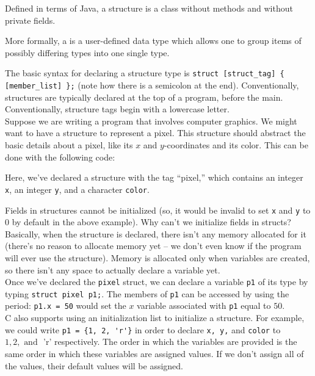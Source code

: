 Defined in terms of Java, a structure is a class without methods and without private fields. 

More formally, a  is a user-defined data type which allows one to group items of possibly differing types into one single type. 

The basic syntax for declaring a structure type is \verb!struct [struct_tag] { [member_list] };! (note how there is a semicolon at the end). Conventionally, structures are typically declared at the top of a program, before the main. Conventionally, structure tags begin with a lowercase letter. \\

Suppose we are writing a program that involves computer graphics. We might want to have a structure to represent a pixel. This structure should abstract the basic details about a pixel, like its $x$ and $y$-coordinates and its color. This can be done with the following code:

\lstset{
caption=Structure Example
}
\begin{center}
\label{Structure Example}
\end{center}


Here, we've declared a structure with the tag ``pixel,'' which contains an integer \verb!x!, an integer \verb!y!, and a character \verb!color!. 


Fields in structures cannot be initialized (so, it would be invalid to set \verb!x! and \verb!y! to $0$ by default in the above example). Why can't we initialize fields in structs? Basically, when the structure is declared, there isn't any memory allocated for it (there's no reason to allocate memory yet -- we don't even know if the program will ever use the structure). Memory is allocated only when variables are created, so there isn't any space to actually declare a variable yet. \\


Once we've declared the \verb!pixel! struct, we can declare a variable \verb!p1! of its type by typing \verb!struct pixel p1;!. The members of \verb!p1! can be accessed by using the period: \verb!p1.x = 50! would set the $x$ variable associated with \verb!p1! equal to $50$. \\

C also supports using an initialization list to initialize a structure. For example, we could write \verb!p1 = {1, 2, 'r'}! in order to declare \verb!x, y,! and \verb!color! to $1, 2, \text{ and }$ 'r' respectively. The order in which the variables are provided is the same order in which these variables are assigned values. If we don't assign all of the values, their default values will be assigned. \\

